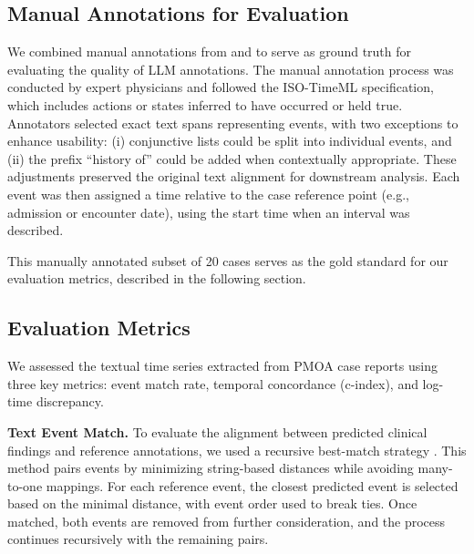 \subsection{Manual Annotations for Evaluation}

We combined manual annotations from \cite{wang2025large} and \cite{noroozizadeh2025reconstructing} to serve as ground truth for evaluating the quality of LLM annotations. 
The manual annotation process was conducted by expert physicians and followed the ISO-TimeML specification, which includes actions or states inferred to have occurred or held true. 
Annotators selected exact text spans representing events, with two exceptions to enhance usability: (i) conjunctive lists could be split into individual events, and (ii) the prefix ``history of'' could be added when contextually appropriate. 
These adjustments preserved the original text alignment for downstream analysis. 
Each event was then assigned a time relative to the case reference point (e.g., admission or encounter date), using the start time when an interval was described.

This manually annotated subset of 20 cases serves as the gold standard for our evaluation metrics, described in the following section.


\subsection{Evaluation Metrics}

We assessed the textual time series extracted from PMOA case reports using three key metrics: event match rate, temporal concordance (c-index), and log-time discrepancy.


\textbf{Text Event Match.} To evaluate the alignment between predicted clinical findings and reference annotations, we used a recursive best-match strategy \citep{wang2025large, noroozizadeh2025reconstructing}. This method pairs events by minimizing string-based distances while avoiding many-to-one mappings. For each reference event, the closest predicted event is selected based on the minimal distance, with event order used to break ties. Once matched, both events are removed from further consideration, and the process continues recursively with the remaining pairs.

